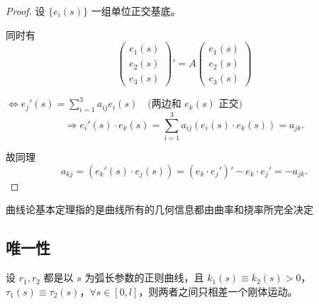 \documentclass[lang=cn,10pt,thmcnt=section]{elegantbook}
\begin{document}
\begin{proof}
    设 $\{e_i(s)\}$ 一组单位正交基底。

同时有
\[
\begin{pmatrix}
e_1(s) \\
e_2(s) \\
e_3(s)
\end{pmatrix}'
=
A
\begin{pmatrix}
e_1(s) \\
e_2(s) \\
e_3(s)
\end{pmatrix}
\]


$\Leftrightarrow e_j'(s) = \sum_{i=1}^3 a_{ij} e_i(s) \quad \text{(两边和 } e_k(s) \text{ 正交)}$
\[
\Rightarrow e_i'(s) \cdot e_k(s) = \sum_{i=1}^3 a_{ij} (e_i(s) \cdot e_k(s)) = a_{jk}.
\]

故同理
\[
a_{kj} = (e_k'(s) \cdot e_j(s)) = (e_k \cdot e_j')' - e_k \cdot e_j' = -a_{jk}.
\]
\end{proof}
曲线论基本定理指的是曲线所有的几何信息都由曲率和挠率所完全决定

\subsection{唯一性}
\begin{theorem}[曲线论基本定理]
设 $r_1, r_2$ 都是以 $s$ 为弧长参数的正则曲线，且 $k_1(s) \equiv k_2(s) > 0$，$\tau_1(s) \equiv \tau_2(s)$，$\forall s \in [0, l]$，则两者之间只相差一个刚体运动。
\end{theorem}
\end{document}
